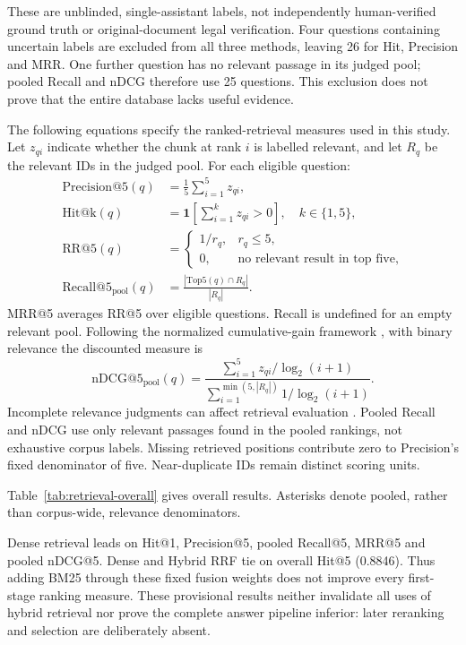 These are unblinded, single-assistant labels, not independently human-verified ground truth or original-document legal verification. Four questions containing uncertain labels are excluded from all three methods, leaving 26 for Hit, Precision and MRR. One further question has no relevant passage in its judged pool; pooled Recall and nDCG therefore use 25 questions. This exclusion does not prove that the entire database lacks useful evidence.

The following equations specify the ranked-retrieval measures used in this study. Let $z_{qi}$ indicate whether the chunk at rank $i$ is labelled relevant, and let $R_q$ be the relevant IDs in the judged pool. For each eligible question:
\begin{align}
\mathrm{Precision@5}(q)&=\frac{1}{5}\sum_{i=1}^{5}z_{qi},\\
\mathrm{Hit@k}(q)&=\mathbf{1}\left[\sum_{i=1}^{k}z_{qi}>0\right],\quad k\in\{1,5\},\\
\mathrm{RR@5}(q)&=\begin{cases}1/r_q,&r_q\leq5,\\0,&\text{no relevant result in top five},\end{cases}\\
\mathrm{Recall@5}_{\mathrm{pool}}(q)&=\frac{|\mathrm{Top5}(q)\cap R_q|}{|R_q|}.
\end{align}
MRR@5 averages RR@5 over eligible questions. Recall is undefined for an empty relevant pool. Following the normalized cumulative-gain framework \cite{ndcg}, with binary relevance the discounted measure is
\begin{equation}
\mathrm{nDCG@5}_{\mathrm{pool}}(q)=
\frac{\sum_{i=1}^{5}z_{qi}/\log_2(i+1)}
{\sum_{i=1}^{\min(5,|R_q|)}1/\log_2(i+1)}.
\end{equation}
Incomplete relevance judgments can affect retrieval evaluation \cite{incompletejudgments}. Pooled Recall and nDCG use only relevant passages found in the pooled rankings, not exhaustive corpus labels. Missing retrieved positions contribute zero to Precision's fixed denominator of five. Near-duplicate IDs remain distinct scoring units.

Table~\ref{tab:retrieval-overall} gives overall results. Asterisks denote pooled, rather than corpus-wide, relevance denominators.

Dense retrieval leads on Hit@1, Precision@5, pooled Recall@5, MRR@5 and pooled nDCG@5. Dense and Hybrid RRF tie on overall Hit@5 (0.8846). Thus adding BM25 through these fixed fusion weights does not improve every first-stage ranking measure. These provisional results neither invalidate all uses of hybrid retrieval nor prove the complete answer pipeline inferior: later reranking and selection are deliberately absent.


